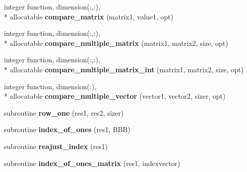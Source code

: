 \begin{DoxyCompactItemize}
\item 
\hypertarget{classcommon__functions_a84b33031853d7ebb46bf5674b384ac9a}{integer function, dimension(\-:,\-:), \\*
allocatable {\bfseries compare\-\_\-matrix} (matrix1, value1, opt)}\label{classcommon__functions_a84b33031853d7ebb46bf5674b384ac9a}

\item 
\hypertarget{classcommon__functions_a2efb3e809d60b8b7a5411dc12507bcc8}{integer function, dimension(\-:,\-:), \\*
allocatable {\bfseries compare\-\_\-multiple\-\_\-matrix} (matrix1, matrix2, size, opt)}\label{classcommon__functions_a2efb3e809d60b8b7a5411dc12507bcc8}

\item 
\hypertarget{classcommon__functions_ab4ecf3cdd8fce8fc6a51acb0c03eca67}{integer function, dimension(\-:,\-:), \\*
allocatable {\bfseries compare\-\_\-multiple\-\_\-matrix\-\_\-int} (matrix1, matrix2, size, opt)}\label{classcommon__functions_ab4ecf3cdd8fce8fc6a51acb0c03eca67}

\item 
\hypertarget{classcommon__functions_a8743b861d84f317c2099171183255319}{integer function, dimension(\-:), \\*
allocatable {\bfseries compare\-\_\-multiple\-\_\-vector} (vector1, vector2, sizer, opt)}\label{classcommon__functions_a8743b861d84f317c2099171183255319}

\item 
\hypertarget{classcommon__functions_abf7ae31765338c243567c1c9dc06687e}{subroutine {\bfseries row\-\_\-one} (res1, res2, sizer)}\label{classcommon__functions_abf7ae31765338c243567c1c9dc06687e}

\item 
\hypertarget{classcommon__functions_a460d2e78c55ab9e3de2fe2a385c5d632}{subroutine {\bfseries index\-\_\-of\-\_\-ones} (res1, B\-B\-B)}\label{classcommon__functions_a460d2e78c55ab9e3de2fe2a385c5d632}

\item 
\hypertarget{classcommon__functions_acaf6a5e229a1ec8f555cd9282252531f}{subroutine {\bfseries reajust\-\_\-index} (res1)}\label{classcommon__functions_acaf6a5e229a1ec8f555cd9282252531f}

\item 
\hypertarget{classcommon__functions_a0888f01433ec20d03988681db7ade6e6}{subroutine {\bfseries index\-\_\-of\-\_\-ones\-\_\-matrix} (res1, indexvector)}\label{classcommon__functions_a0888f01433ec20d03988681db7ade6e6}


\end{DoxyCompactItemize}
